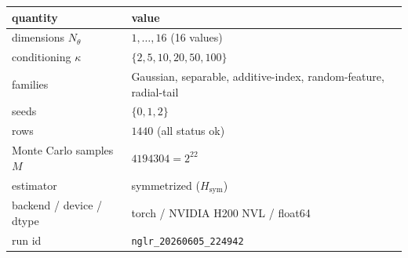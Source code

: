 \begin{tabular}{ll}
\toprule
quantity & value \\
\midrule
dimensions $N_\theta$ & $1,\dots,16$ (16 values) \\
conditioning $\kappa$ & $\{2,5,10,20,50,100\}$ \\
families & Gaussian, separable, additive-index, random-feature, radial-tail \\
seeds & $\{0,1,2\}$ \\
rows & $1440$ (all status ok) \\
Monte Carlo samples $M$ & $4194304=2^{22}$ \\
estimator & symmetrized ($H_{\mathrm{sym}}$) \\
backend / device / dtype & torch / NVIDIA H200 NVL / float64 \\
run id & \texttt{nglr\_20260605\_224942} \\
\bottomrule
\end{tabular}
